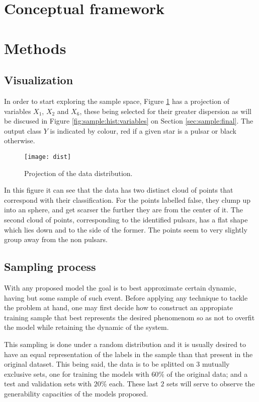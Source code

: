 \documentclass[journal]{IEEEtran}
\begin{document}
\section{Conceptual framework\label{sec:framework}}


\section{Methods\label{sec:methods}}

\subsection{Visualization}

In order to start exploring the sample space, Figure \ref{fig:dist} has a
projection of variables $X_1$, $X_2$ and $X_6$, these being selected for their
greater dispersion as will be discused in Figure \ref{fig:sample:hist:variables}
on Section \ref{sec:sample:final}. The output class $Y$ is indicated by
colour, red if a given star is a pulsar or black otherwise. 

\begin{figure}[ht]
    \texttt{[image: dist]}
    \caption{Projection of the data distribution. \label{fig:dist}}
\end{figure}

In this figure it can see that the data has two distinct cloud of points that
correspond with their classification. For the points labelled false, they clump
up into an sphere, and get scarser the further they are from the center of it.
The second cloud of points, corresponding to the identified pulsars, has a flat
shape which lies down and to the side of the former. The points seem to very
slightly group away from the non pulsars.

\subsection{Sampling process\label{sec:sample}}

With any proposed model the goal is to best approximate certain dynamic, having
but some sample of such event. Before applying any technique to tackle the
problem at hand, one may first decide how to construct an appropiate training
sample that best represents the desired phenomenom so as not to overfit the
model while retaining the dynamic of the system.

This sampling is done under a random distribution and it is usually desired to
have an equal representation of the labels in the sample than that present in
the original dataset. This being said, the data is to be splitted on $3$
mutually exclusive sets, one for training the models with $60\%$ of the original
data; and a test and validation sets with $20\%$ each. These last $2$ sets will
serve to observe the generability capacities of the models proposed.
\end{document}
